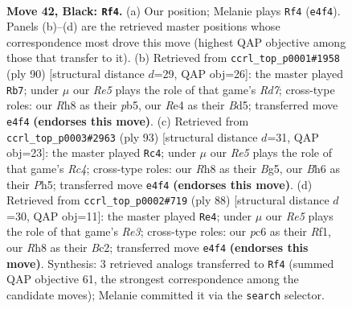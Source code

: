 \documentclass[11pt]{article}
\begin{document}
\clearpage

\begin{figure}[p]\centering
\begin{subfigure}{0.46\textwidth}\centering
\resizebox{\linewidth}{!}{%
\newchessgame
\chessboard[
  setfen={7r/5P2/R1Pk3b/1R6/1P2r2p/5B2/5K2/8 b - - 6 42},
  showmover=false,
  pgfstyle=straightmove, color=movearrow, markmove={e4-f4}
]}
\caption{}
\end{subfigure}\hfill
\begin{subfigure}{0.46\textwidth}\centering
\resizebox{\linewidth}{!}{%
\newchessgame
\chessboard[
  setfen={1r6/3Rp3/P3bk2/1p1B3p/7p/8/7K/8 w - - 0 46},
  showmover=false,
  pgfstyle=straightmove, color=movearrow, markmove={d7-b7}
]}
\caption{}
\end{subfigure}
\\[4pt]
\begin{subfigure}{0.46\textwidth}\centering
\resizebox{\linewidth}{!}{%
\newchessgame
\chessboard[
  setfen={8/8/4k3/1pr3bp/3BK3/P4R1P/8/8 b - - 14 47},
  showmover=false,
  pgfstyle=straightmove, color=movearrow, markmove={c5-c4}
]}
\caption{}
\end{subfigure}\hfill
\begin{subfigure}{0.46\textwidth}\centering
\resizebox{\linewidth}{!}{%
\newchessgame
\chessboard[
  setfen={6k1/1p4p1/3rn3/6b1/p7/P3R3/2B5/5R1K w - - 1 45},
  showmover=false,
  pgfstyle=straightmove, color=movearrow, markmove={e3-e4}
]}
\caption{}
\end{subfigure}
\caption{\textbf{Move 42, Black: \texttt{Rf4}.} (a) Our position; Melanie plays \texttt{Rf4} (\texttt{e4f4}). Panels (b)--(d) are the retrieved master positions whose correspondence most drove this move (highest QAP objective among those that transfer to it). (b) Retrieved from \texttt{ccrl\_top\_p0001\#1958} (ply 90) [structural distance $d$=29, QAP obj=26]: the master played \texttt{Rb7}; under $\mu$ our \emph{Re5} plays the role of that game's \emph{Rd7}; cross-type roles: our \emph{R}h8 as their \emph{p}b5, our \emph{R}e4 as their \emph{B}d5; transferred move \texttt{e4f4} \textbf{(endorses this move)}. (c) Retrieved from \texttt{ccrl\_top\_p0003\#2963} (ply 93) [structural distance $d$=31, QAP obj=23]: the master played \texttt{Rc4}; under $\mu$ our \emph{Re5} plays the role of that game's \emph{Rc4}; cross-type roles: our \emph{R}h8 as their \emph{B}g5, our \emph{B}h6 as their \emph{P}h5; transferred move \texttt{e4f4} \textbf{(endorses this move)}. (d) Retrieved from \texttt{ccrl\_top\_p0002\#719} (ply 88) [structural distance $d$=30, QAP obj=11]: the master played \texttt{Re4}; under $\mu$ our \emph{Re5} plays the role of that game's \emph{Re3}; cross-type roles: our \emph{p}c6 as their \emph{R}f1, our \emph{R}h8 as their \emph{B}c2; transferred move \texttt{e4f4} \textbf{(endorses this move)}. Synthesis: 3 retrieved analogs transferred to \texttt{Rf4} (summed QAP objective 61, the strongest correspondence among the candidate moves); Melanie committed it via the \texttt{search} selector.}
\label{fig:thought-m83}
\end{figure}
\end{document}
